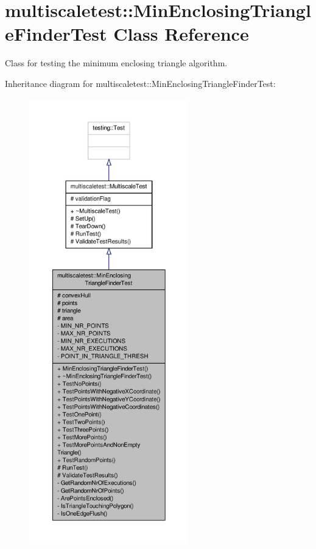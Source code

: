 \hypertarget{classmultiscaletest_1_1MinEnclosingTriangleFinderTest}{\section{multiscaletest\-:\-:Min\-Enclosing\-Triangle\-Finder\-Test Class Reference}
\label{classmultiscaletest_1_1MinEnclosingTriangleFinderTest}
}


Class for testing the minimum enclosing triangle algorithm.  




Inheritance diagram for multiscaletest\-:\-:Min\-Enclosing\-Triangle\-Finder\-Test\-:\nopagebreak
\begin{figure}[H]
\begin{center}
\leavevmode
\includegraphics[height=550pt]{classmultiscaletest_1_1MinEnclosingTriangleFinderTest__inherit__graph}
\end{center}
\end{figure}


